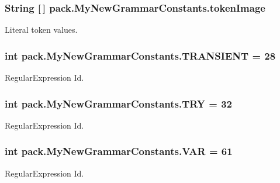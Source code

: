 \subsubsection[{\texorpdfstring{token\+Image}{tokenImage}}]{\setlength{\rightskip}{0pt plus 5cm}String \mbox{[}$\,$\mbox{]} pack.\+My\+New\+Grammar\+Constants.\+token\+Image}\hypertarget{interfacepack_1_1_my_new_grammar_constants_ab57e8a0d62552824d8319c9c81a1457a}{}\label{interfacepack_1_1_my_new_grammar_constants_ab57e8a0d62552824d8319c9c81a1457a}
Literal token values. 
\subsubsection[{\texorpdfstring{T\+R\+A\+N\+S\+I\+E\+NT}{TRANSIENT}}]{\setlength{\rightskip}{0pt plus 5cm}int pack.\+My\+New\+Grammar\+Constants.\+T\+R\+A\+N\+S\+I\+E\+NT = 28}\hypertarget{interfacepack_1_1_my_new_grammar_constants_ae41fb601136904c70f5fccad65322197}{}\label{interfacepack_1_1_my_new_grammar_constants_ae41fb601136904c70f5fccad65322197}
Regular\+Expression Id. 
\subsubsection[{\texorpdfstring{T\+RY}{TRY}}]{\setlength{\rightskip}{0pt plus 5cm}int pack.\+My\+New\+Grammar\+Constants.\+T\+RY = 32}\hypertarget{interfacepack_1_1_my_new_grammar_constants_a618e8add5bab6e583b343f3d4771470c}{}\label{interfacepack_1_1_my_new_grammar_constants_a618e8add5bab6e583b343f3d4771470c}
Regular\+Expression Id. 
\subsubsection[{\texorpdfstring{V\+AR}{VAR}}]{\setlength{\rightskip}{0pt plus 5cm}int pack.\+My\+New\+Grammar\+Constants.\+V\+AR = 61}\hypertarget{interfacepack_1_1_my_new_grammar_constants_acd1aca893f08fd3ee4d26c8aa1d1b6bc}{}\label{interfacepack_1_1_my_new_grammar_constants_acd1aca893f08fd3ee4d26c8aa1d1b6bc}
Regular\+Expression Id. 
